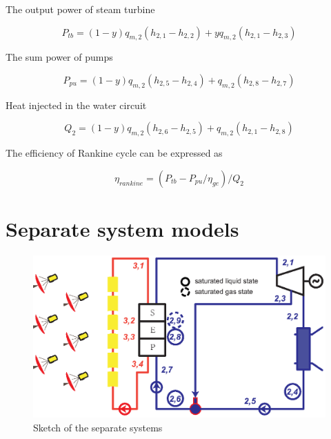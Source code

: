 \documentclass{article}
\begin{document}
The output power of steam turbine

\begin{equation*}
	P_{tb}=\left(1-y\right)q_{m,2}\left(h_{2,1}-h_{2,2}\right)+yq_{m,2}\left(h_{2,1}-h_{2,3}\right)
\end{equation*}

The sum power of pumps

\begin{equation*}
	P_{pu}=\left(1-y\right)q_{m,2}\left(h_{2,5}-h_{2,4}\right)+q_{m,2}\left(h_{2,8}-h_{2,7}\right)
\end{equation*}

Heat injected in the water circuit

\begin{equation*}
	Q_2=\left(1-y\right)q_{m,2}\left(h_{2,6}-h_{2,5}\right)+q_{m,2}\left(h_{2,1}-h_{2,8}\right)
\end{equation*}

The efficiency of Rankine cycle can be expressed as

\begin{equation*}
	\eta_{rankine}=(P_{tb}-P_{pu}/\eta_{ge})/Q_{2}
\end{equation*}

%

\section{Separate system models}

\noindent \begin{figure}[htbp]
\begin{center}
	\includegraphics[width = 0.7\columnwidth]{./graphics/separateSystem}
	\caption{Sketch of the separate systems}
	\label{fig:System-2}
\end{center}
\end{figure}
\end{document}
